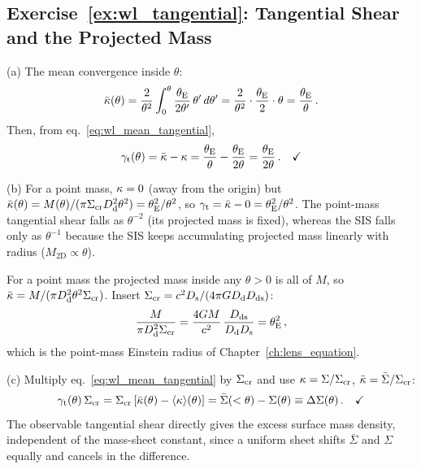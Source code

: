 \subsection*{Exercise~\ref{ex:wl_tangential}: Tangential Shear and the Projected Mass}

(a) The mean convergence inside $\theta$:
\begin{equation*}
    \bar\kappa(\theta) = \frac{2}{\theta^2}\int_0^\theta
    \frac{\theta_{\mathrm{E}}}{2\theta'}\,\theta'\,d\theta'
    = \frac{2}{\theta^2}\cdot\frac{\theta_{\mathrm{E}}}{2}\cdot\theta
    = \frac{\theta_{\mathrm{E}}}{\theta}\,.
\end{equation*}
Then, from eq.~\eqref{eq:wl_mean_tangential},
\begin{equation*}
    \gamma_{\mathrm t}(\theta) = \bar\kappa - \kappa
    = \frac{\theta_{\mathrm{E}}}{\theta} - \frac{\theta_{\mathrm{E}}}{2\theta}
    = \frac{\theta_{\mathrm{E}}}{2\theta}\,. \quad \checkmark
\end{equation*}

(b) For a point mass, $\kappa = 0$ (away from the origin) but
$\bar\kappa(\theta) = M(\theta)/(\pi\Sigma_{\mathrm{cr}}D_{\mathrm{d}}^2\theta^2) =
\theta_{\mathrm{E}}^2/\theta^2$, so
$\gamma_{\mathrm t} = \bar\kappa - 0 = \theta_{\mathrm{E}}^2/\theta^2$.  The point-mass
tangential shear falls as $\theta^{-2}$ (its projected mass is fixed),
whereas the SIS falls only as $\theta^{-1}$ because the SIS keeps
accumulating projected mass linearly with radius
($M_{\mathrm{2D}} \propto \theta$).

\begin{derivation}[Exercise~\ref{ex:wl_tangential}(b), why $\bar\kappa = \thetaE^2/\theta^2$]
For a point mass the projected mass inside any $\theta > 0$ is all of $M$,
so $\bar\kappa = M/(\pi D_{\mathrm{d}}^2\theta^2\Sigma_{\mathrm{cr}})$.  Insert
$\Sigma_{\mathrm{cr}} = c^2D_{\mathrm{s}}/(4\pi GD_{\mathrm{d}}D_{\mathrm{ds}})$:
\begin{equation*}
    \frac{M}{\pi D_{\mathrm{d}}^2\Sigma_{\mathrm{cr}}} = \frac{4G M}{c^2}\,
    \frac{D_{\mathrm{ds}}}{D_{\mathrm{d}}D_{\mathrm{s}}} = \theta_{\mathrm{E}}^2\,,
\end{equation*}
which is the point-mass Einstein radius of Chapter~\ref{ch:lens_equation}.
\end{derivation}

(c) Multiply eq.~\eqref{eq:wl_mean_tangential} by $\Sigma_{\mathrm{cr}}$ and
use $\kappa = \Sigma/\Sigma_{\mathrm{cr}}$, $\bar\kappa = \bar\Sigma/\Sigma_{\mathrm{cr}}$:
\begin{equation*}
    \gamma_{\mathrm t}(\theta)\,\Sigma_{\mathrm{cr}}
    = \Sigma_{\mathrm{cr}}\left[\bar\kappa(\theta) - \langle\kappa\rangle(\theta)\right]
    = \bar\Sigma(<\theta) - \Sigma(\theta)
    \equiv \Delta\Sigma(\theta)\,. \quad \checkmark
\end{equation*}
The observable tangential shear directly gives the excess surface mass
density, independent of the mass-sheet constant, since a uniform sheet
shifts $\bar\Sigma$ and $\Sigma$ equally and cancels in the difference.

